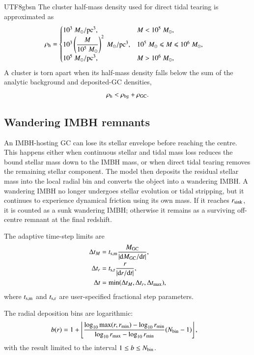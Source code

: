 \documentclass[trackchanges, twocolappendix, twocolumn]{aastex701}
\begin{document}
\begin{CJK*}{UTF8}{gbsn}
The cluster half-mass density used for direct tidal tearing is approximated as \citep{Fragione+2019GC}
\begin{align}
\rho_{\rm h} & = \begin{cases}
10^3~M_\odot/{\rm pc}^3, & M < 10^5~M_\odot,\\
10^3 \left( \dfrac{M}{10^5~M_\odot} \right)^2~M_\odot/{\rm pc}^3, & 10^5~M_\odot \leqslant M \leqslant 10^6~M_\odot,\\
10^5~M_\odot/{\rm pc}^3, & M > 10^6~M_\odot,
\end{cases}
\label{eq:rho_h}
\end{align}
A cluster is torn apart when its half-mass density falls below the sum of the analytic background and deposited-GC densities,
\begin{align}
\rho_{\rm h} < \rho_{\rm bg} + \rho_{\rm GC} .
\end{align}

\subsection{Wandering IMBH remnants} \label{subect:wanderIMBH}

An IMBH-hosting GC can lose its stellar envelope before reaching the centre. This happens either when continuous stellar and tidal mass loss reduces the bound stellar mass down to the IMBH mass, or when direct tidal tearing removes the remaining stellar component. The model then deposits the residual stellar mass into the local radial bin and converts the object into a wandering IMBH\@. A wandering IMBH no longer undergoes stellar evolution or tidal stripping, but it continues to experience dynamical friction using its own mass. If it reaches $r_{\rm sink}$, it is counted as a sunk wandering IMBH; otherwise it remains as a surviving off-centre remnant at the final redshift.

The adaptive time-step limits are
\begin{align}
\Delta t_M &= t_{\rm s,m}\dfrac{M_{\rm GC}}{|{\rm d} M_{\rm GC}/{\rm d} t|},\\
\Delta t_r &= t_{\rm s,r}\dfrac{r}{|{\rm d} r/{\rm d} t|},\\
\Delta t &= \min(\Delta t_M,\Delta t_r,\Delta t_{\max}),
\end{align}
where $t_{\rm s,m}$ and $t_{\rm s,r}$ are user-specified fractional step parameters.

The radial deposition bins are logarithmic:
\begin{align}
b(r) &= 1+\left\lfloor
\dfrac{\log_{10}\max(r,r_{\min})-\log_{10}r_{\min}}
{\log_{10}r_{\max}-\log_{10}r_{\min}}
(N_{\rm bin}-1)
\right\rfloor ,
\end{align}
with the result limited to the interval $1\leq b\leq N_{\rm bin}$.


\end{CJK*}
\end{document}
